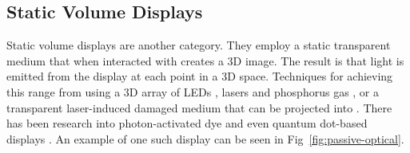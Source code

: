\begin{invisBox}
  
  \hfill
\end{invisBox}

\subsection{Static Volume Displays}
Static volume displays are another category. They employ a static transparent medium that when interacted with creates a 3D image. The result is that light is emitted from the display at each point in a 3D space. Techniques for achieving this range from using a 3D array of LEDs \cite{10.1145/2341931.2341937}, lasers and phosphorus gas \cite{https://doi.org/10.1002/anie.202003160}, or a transparent laser-induced damaged medium that can be projected into \cite{10.1145/1179849.1179982}. There has been research into photon-activated dye \cite{Patel2017} and even quantum dot-based displays \cite{Hirayama2015}. An example of one such display can be seen in Fig~\ref{fig:passive-optical}.

